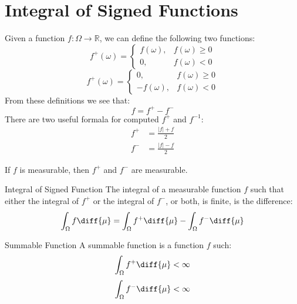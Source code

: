         \section{Integral of Signed Functions}
            Given a function $f:\Omega\rightarrow\mathbb{R}$, we can define
            the following two functions:
            \begin{equation}
                f^{+}(\omega)=
                \begin{cases}
                    f(\omega),&f(\omega)\geq{0}\\
                    0,&f(\omega)<0
                \end{cases}
            \end{equation}
            \begin{equation}
                f^{+}(\omega)=
                \begin{cases}
                    0,&f(\omega)\geq{0}\\
                    -f(\omega),&f(\omega)<0
                \end{cases}
            \end{equation}
            From these definitions we see that:
            \begin{equation}
                f=f^{+}-f^{-}
            \end{equation}
            There are two useful formala for computed $f^{+}$ and $f^{-1}$:
            \begin{align}
                f^{+}&=\frac{|f|+f}{2}\\
                f^{-}&=\frac{|f|-f}{2}
            \end{align}
            \begin{theorem}
                If $f$ is measurable, then $f^{+}$ and $f^{-}$ are measurable.
            \end{theorem}
            \begin{ldefinition}{Integral of Signed Function}
                The integral of a measurable function $f$ such that either
                the integral of $f^{+}$ or the integral of $f^{-}$, or both,
                is finite, is the difference:
                \begin{equation}
                    \int_{\Omega}f\diff{\mu}=
                    \int_{\Omega}f^{+}\diff{\mu}-\int_{\Omega}f^{-}\diff{\mu}
                \end{equation}
            \end{ldefinition}
            \begin{ldefinition}{Summable Function}
                A summable function is a function $f$ such:
                \begin{equation}
                    \int_{\Omega}f^{+}\diff{\mu}<\infty
                \end{equation}
                \begin{equation}
                    \int_{\Omega}f^{-}\diff{\mu}<\infty
                \end{equation}
            \end{ldefinition}
